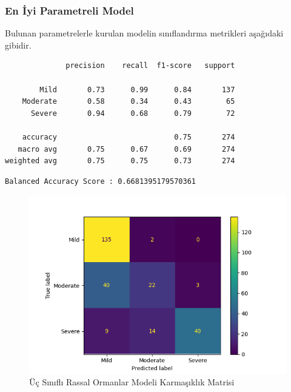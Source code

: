 \documentclass[12pt,twoside]{deuthesis}
\begin{document}
\hypertarget{en-iyi-parametreli-model-1}{%
\subsubsection{En İyi Parametreli Model}\label{en-iyi-parametreli-model-1}}

Bulunan parametrelerle kurulan modelin sınıflandırma metrikleri aşağıdaki gibidir.
\begin{verbatim}
              precision    recall  f1-score   support

        Mild       0.73      0.99      0.84       137
    Moderate       0.58      0.34      0.43        65
      Severe       0.94      0.68      0.79        72

    accuracy                           0.75       274
   macro avg       0.75      0.67      0.69       274
weighted avg       0.75      0.75      0.73       274
\end{verbatim}
\begin{verbatim}
Balanced Accuracy Score : 0.6681395179570361
\end{verbatim}
\begin{figure}

{\centering \includegraphics[width=1.05\linewidth,height=0.6\textheight]{figure/rfc_conf} 

}

\caption{Üç Sınıflı Rassal Ormanlar Modeli Karmaşıklık Matrisi}\label{fig:unnamed-chunk-32}
\end{figure}
\end{document}
